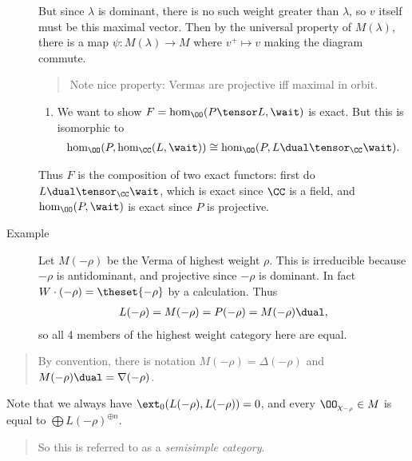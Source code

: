 \begin{description}
But since \(\lambda\) is dominant, there is no such weight greater than
\(\lambda\), so \(v\) itself must be this maximal vector. Then by the
universal property of \(M(\lambda)\), there is a map
\(\psi: M(\lambda) \to M\) where \(v^+ \mapsto v\) making the diagram
commute.

\begin{quote}
Note nice property: Vermas are projective iff maximal in orbit.
\end{quote}

\begin{enumerate}
\def\labelenumi{\alph{enumi}.}
\setcounter{enumi}{1}
\tightlist
\item
  We want to show \(F = \hom_\OO(P\tensor L, \wait)\) is exact. But this
  is isomorphic to
  \begin{align*}\hom_\OO(P, \hom_\CC(L, \wait)) \cong \hom_\OO(P, L\dual \tensor_\CC \wait).\end{align*}
\end{enumerate}

Thus \(F\) is the composition of two exact functors: first do
\(L\dual \tensor_\CC \wait\), which is exact since \(\CC\) is a field,
and \(\hom_\OO(P,\wait)\) is exact since \(P\) is projective.
\item[Example]
Let \(M(-\rho)\) be the Verma of highest weight \(\rho\). This is
irreducible because \(-\rho\) is antidominant, and projective since
\(-\rho\) is dominant. In fact \(W\cdot(-\rho) = \theset{-\rho}\) by a
calculation. Thus
\begin{align*}L(-\rho) = M(-\rho) = P(-\rho) = M(-\rho)\dual,\end{align*}
so all 4 members of the highest weight category here are equal.
\end{description}

\begin{quote}
By convention, there is notation \(M(-\rho) = \Delta(-\rho)\) and
\(M(-\rho)\dual = \nabla(-\rho)\).
\end{quote}

Note that we always have \(\ext_0(L(-\rho), L(-\rho)) = 0\), and every
\(\OO_{\chi_{-\rho}} \in M\) is equal to
\(\bigoplus L(-\rho)^{\oplus n}\).

\begin{quote}
So this is referred to as a \emph{semisimple category}.
\end{quote}


